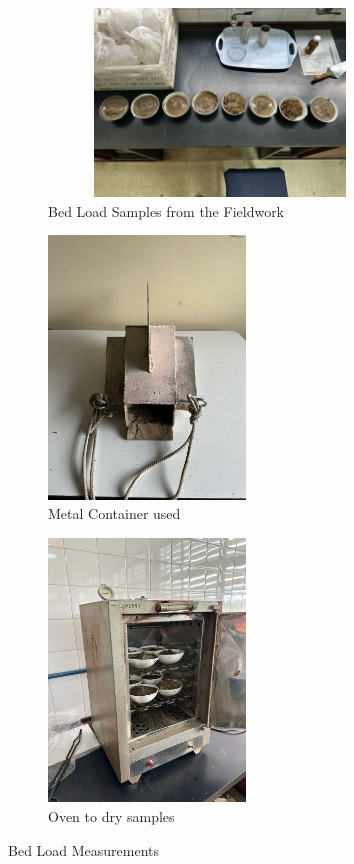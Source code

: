 \begin{figure}[H]
    \centering
    \begin{subfigure}[a]{0.6\textwidth}
        \includegraphics[width= 10cm, height =5cm]{figures/appendixE/soilsamples.jpg}
        \caption{Bed Load Samples from the Fieldwork}
        
    \end{subfigure}

    \vspace{0.5cm}

    \begin{subfigure}[b]{0.48\textwidth}
        \includegraphics[width=\linewidth, height=7cm]{figures/appendixE/metalcontainer.jpg}
        \caption{Metal Container used}
        
    \end{subfigure}
    \hfill
    \begin{subfigure}[c]{0.48\textwidth}
        \includegraphics[width=\linewidth, height=7cm]{figures/appendixE/oven.jpg}
        \caption{Oven to dry samples}
        
    \end{subfigure}

    \caption{Bed Load Measurements}
    \label{fig:bed load}
\end{figure}

